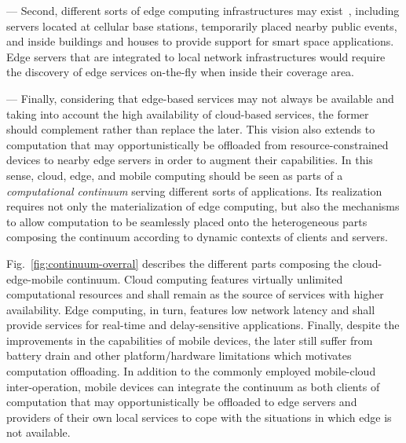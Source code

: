 --- Second, different sorts of edge computing infrastructures may exist~\cite{1,2,Tarneberg2017}, including servers located at cellular base stations, temporarily placed nearby public events, and inside buildings and houses to provide support for smart space applications. Edge servers that are integrated to local network infrastructures would require the discovery of edge services on-the-fly when inside their coverage area.

--- Finally, considering that edge-based services may not always be available and taking into account the high availability of cloud-based services, the former should complement rather than replace the later. This vision also extends to computation that may opportunistically be offloaded from resource-constrained devices to nearby edge servers in order to augment their capabilities. In this sense, cloud, edge, and mobile computing should be seen as parts of a \textit{computational continuum} serving different sorts of applications. Its realization requires not only the materialization of edge computing,
but also the mechanisms to allow computation to be seamlessly placed onto the heterogeneous parts composing the continuum according to dynamic contexts of clients and servers. %





Fig.~\ref{fig:continuum-overral} describes the different parts composing the cloud-edge-mobile continuum. Cloud computing features virtually unlimited computational resources and shall remain as the source of services with higher availability. Edge computing, in turn, features low network latency and shall provide services for real-time and delay-sensitive applications. Finally, despite the improvements in the capabilities of mobile devices, the later still suffer from battery drain and other platform/hardware limitations which motivates computation offloading. In addition to the commonly employed mobile-cloud inter-operation, mobile devices can integrate the continuum as both clients of computation that may opportunistically be offloaded to edge servers and providers of their own local services to cope with the situations in which edge is not available. 


